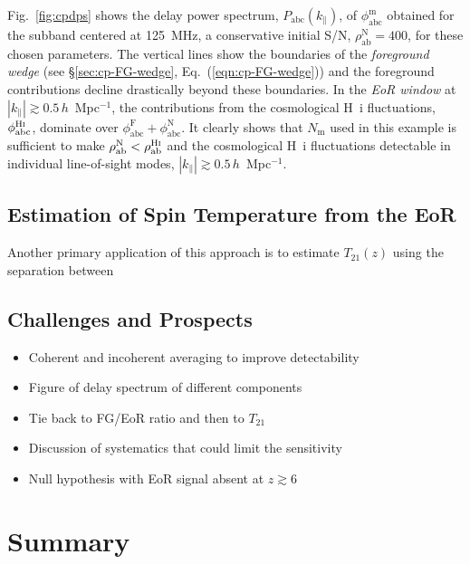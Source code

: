 \documentclass[
reprint,
superscriptaddress,
amsmath,
amssymb,
aps,
]{revtex4-1}
\begin{document}
Fig.~\ref{fig:cpdps} shows the delay power spectrum, $P_\textrm{abc}(k_\parallel)$, of $\phi_\textrm{abc}^\textrm{m}$ obtained for the subband centered at 125~MHz, a conservative initial S/N, $\rho_\textrm{ab}^\textrm{N}=400$,  for these chosen parameters. The vertical lines show the boundaries of the {\it foreground wedge} (see \S\ref{sec:cp-FG-wedge}, Eq.~(\ref{eqn:cp-FG-wedge})) and the foreground contributions decline drastically beyond these boundaries. In the {\it EoR window} at $|k_\parallel| \gtrsim 0.5\,h$~Mpc$^{-1}$, the contributions from the cosmological H~{\sc i} fluctuations, $\phi_\textrm{abc}^\textrm{H{\sc i}}$, dominate over $\phi_\textrm{abc}^\textrm{F} + \phi_\textrm{abc}^\textrm{N}$. It clearly shows that $N_\textrm{m}$ used in this example is sufficient to make $\rho_\textrm{ab}^\textrm{N} < \rho_\textrm{ab}^\textrm{H{\sc i}}$ and the cosmological H~{\sc i} fluctuations detectable in individual line-of-sight modes, $|k_\parallel| \gtrsim 0.5\,h$~Mpc$^{-1}$. 

\subsection{Estimation of Spin Temperature from the EoR}\label{sec:spin-temp}

Another primary application of this approach is to estimate $T_{21}(z)$ using the separation between 

\subsection{Challenges and Prospects}\label{sec:challenges-prospects}

\begin{itemize}
  \item Coherent and incoherent averaging to improve detectability
  \item Figure of delay spectrum of different components
  \item Tie back to FG/EoR ratio and then to $T_{21}$
  \item Discussion of systematics that could limit the sensitivity
  \item Null hypothesis with EoR signal absent at $z\gtrsim 6$
\end{itemize}

\section{Summary}\label{sec:summary}
\end{document}
